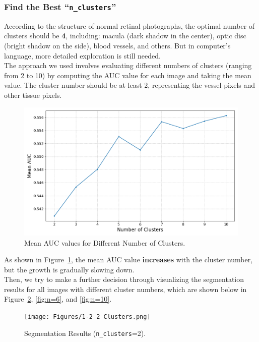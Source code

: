 \documentclass[12pt,letterpaper]{article}
\begin{document}
\subsubsection{Find the Best ``\texttt{n\_clusters}''}
According to the structure of normal retinal photographs, the optimal number of clusters should be \textbf{4}, including: macula (dark shadow in the center), optic disc (bright shadow on the side), blood vessels, and others. But in computer's language, more detailed exploration is still needed. \\
The approach we used involves evaluating different numbers of clusters (ranging from 2 to 10) by computing the AUC value for each image and taking the mean value. The cluster number should be at least 2, representing the vessel pixels and other tissue pixels. 
\begin{figure}[H]
    \centering
    \includegraphics[scale=0.5]{Figures/1-1 Find the Best n_clusters.png}
    \caption{Mean AUC values for Different Number of Clusters.}
    \label{fig:nclusters}
\end{figure}
\noindent
As shown in Figure~\ref{fig:nclusters}, the mean AUC value \textbf{increases} with the cluster number, but the growth is gradually slowing down. \\
Then, we try to make a further decision through visualizing the segmentation results for all images with different cluster numbers, which are shown below in Figure~\ref{fig:n=2}, \ref{fig:n=6}, and \ref{fig:n=10}. 
\begin{figure}[H]
    \centering
    \texttt{[image: Figures/1-2 2 Clusters.png]}
    \vspace{-0.25cm}
    \caption{Segmentation Results (\texttt{n\_clusters}=2).}
    \label{fig:n=2}
\end{figure}
\vspace{-1cm}
\end{document}

